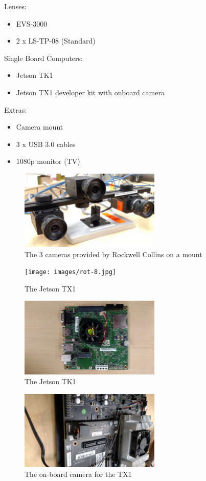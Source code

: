 \documentclass[letterpaper,10pt,titlepage]{IEEEtran}
\begin{document}
	Lenses: 
		\begin{itemize}
		\item EVS-3000 
		\item 2 x LS-TP-08 (Standard)\\
		\end{itemize}
	Single Board Computers: 
		\begin{itemize}
		\item Jetson TK1
		\item Jetson TX1 developer kit with onboard camera\\
		\end{itemize}
	Extras: 
		\begin{itemize}
		\item Camera mount
		\item 3 x USB 3.0 cables
		\item 1080p monitor (TV)\\
		\end{itemize}
\begin{figure}[!ht]
  \caption{The 3 cameras provided by Rockwell Collins on a mount}
	  \centering
		    \includegraphics[width=0.6\textwidth]{images/IMG_20160210_131527329.jpg}
				\end{figure}
\begin{figure}[!ht]
  \caption{The Jetson TX1}
	  \centering
		    \texttt{[image: images/rot-8.jpg]}
				\end{figure}
\begin{figure}[!ht]
  \caption{The Jetson TK1}
	  \centering
		    \includegraphics[width=0.6\textwidth]{images/rot-9.jpg}
				\end{figure}
\begin{figure}[!ht]
  \caption{The on-board camera for the TX1 }
	  \centering
		    \includegraphics[width=0.6\textwidth]{images/rot-3.jpg}
				\end{figure}
\end{document}
